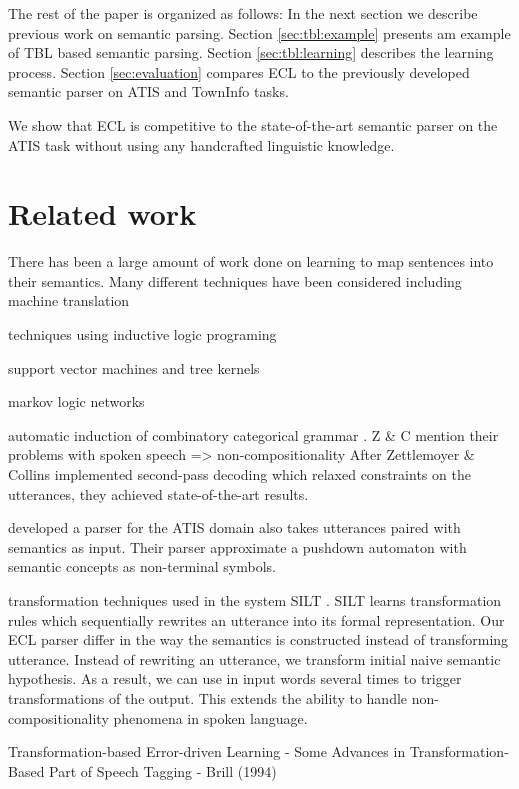 \documentclass[11pt]{article}
\begin{document}
The rest of the paper is organized as follows: In
the next section we describe previous work on semantic parsing. Section \ref{sec:tbl:example} presents am example of TBL based semantic parsing. Section \ref{sec:tbl:learning} describes the learning process. Section
\ref{sec:evaluation} compares ECL to the previously developed semantic parser on ATIS \cite{atis94} and TownInfo \cite{williams07,thomson08} tasks.

We show that ECL is competitive to the state-of-the-art semantic parser on the ATIS task without using any handcrafted linguistic knowledge.


\section{Related work}

There has been a large amount of work done on learning to map sentences 
into their semantics. Many different techniques have been considered including machine translation \cite{wong06} 

techniques using inductive logic programing \cite{lappoon01}

support vector machines \cite{mairesse09} and tree kernels \cite{kate08}

markov logic networks \cite{meza08a,meza08b}

automatic induction of combinatory categorical grammar \cite{zettlemoyer07}. 
Z \& C mention their problems with spoken speech => non-compositionality
 After Zettlemoyer \& Collins implemented second-pass decoding which relaxed constraints on the utterances, they achieved state-of-the-art results.

\cite{he06} developed a parser for the ATIS domain also takes utterances paired with semantics as input. Their parser approximate a pushdown automaton with semantic concepts as non-terminal symbols.  

transformation techniques used in the system SILT \cite{kate05}. SILT learns transformation rules which sequentially rewrites an utterance into its formal representation. Our ECL parser differ in the way the semantics is constructed instead of transforming utterance. Instead of rewriting an utterance, we transform initial naive semantic hypothesis. As a result, we can use in input words several times to trigger transformations of the output. This extends the ability to handle non-compositionality phenomena in spoken language.


Transformation-based Error-driven Learning - Some Advances in Transformation-Based Part of Speech Tagging - Brill (1994)
\end{document}
